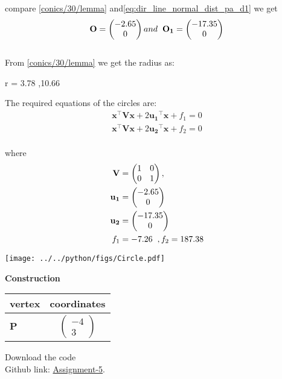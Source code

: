 \documentclass[10pt,a4paper]{report}
\newcommand{\myvec}[1]{\ensuremath{\begin{pmatrix}#1\end{pmatrix}}}
\let\vec\mathbf
\let\vec\mathbf
\begin{document}
\begin{multicols}{2}
 
compare \eqref{conics/30/lemma} and\eqref{eq:dir_line_normal_dist_pa_d1} we get\\
\begin{align}
\vec{O}=\myvec{-2.65\\
0} and\hspace{2mm} \vec{O_1}=\myvec{-17.35\\
0}
\end{align}\\
From \eqref{conics/30/lemma} we get the radius as:\\
\begin{center}
r = 3.78 ,10.66
\end{center}
\vspace{1mm}
The required equations of the circles are:\\
\begin{align}
    \label{eq:conic_quad_form1}
    \vec{x}^{\top}\vec{V}\vec{x}+2\vec{u_1}^{\top}\vec{x}+f_1=0\\
     \vec{x}^{\top}\vec{V}\vec{x}+2\vec{u_2}^{\top}\vec{x}+f_2=0
    \end{align}\\
    where\\
    \begin{align}
	\label{eq:V_matrix}
	\vec{V} &= \myvec{1 & 0\\0 & 1},
	\\
	\label{eq:u_vector}
	\vec{u_1} &= \myvec{-2.65\\0}\\
	\vec{u_2} &= \myvec{-17.35\\0}
	\\
	\label{eq:fvalue}
	f_1 &= -7.26 \hspace{2mm}, f_2=187.38
\end{align}
\begin{center}
\texttt{[image: ../../python/figs/Circle.pdf]}   
 \end{center}\vspace{1mm}
 
 \vspace{2mm} \textbf{Construction}
\begin{center}
\setlength{\arrayrulewidth}{0.5mm}
\setlength{\tabcolsep}{6pt}
\renewcommand{\arraystretch}{1.5}
    \begin{tabular}{|l|c|}
    \hline 
    \textbf{vertex} & \textbf{coordinates} \\ \hline
   $\vec{P}$ & $\myvec{
   -4\\
   3
   } $ \\\hline
      \end{tabular}
  \end{center}
  
\raggedright  Download the code \\
Github link: \href{https://github.com/KrishnaYadati/Assignments/blob/main/Matrix-line_assignment/line_program/circle.py}{Assignment-5}.
  \end{multicols}
\end{document}
